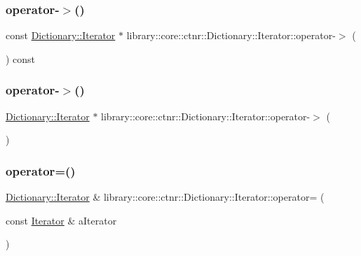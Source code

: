 \subsubsection{\texorpdfstring{operator-\/$>$()}{operator->()}\hspace{0.1cm}{\footnotesize\ttfamily [1/2]}}
{\footnotesize\ttfamily const \mbox{\hyperlink{classlibrary_1_1core_1_1ctnr_1_1_dictionary_1_1_iterator}{Dictionary\+::\+Iterator}} $\ast$ library\+::core\+::ctnr\+::\+Dictionary\+::\+Iterator\+::operator-\/$>$ (\begin{DoxyParamCaption}{ }\end{DoxyParamCaption}) const}

\mbox{\label{classlibrary_1_1core_1_1ctnr_1_1_dictionary_1_1_iterator_a0cb70d2bc0b4cb3e56bb3c951651ee93}} 
\subsubsection{\texorpdfstring{operator-\/$>$()}{operator->()}\hspace{0.1cm}{\footnotesize\ttfamily [2/2]}}
{\footnotesize\ttfamily \mbox{\hyperlink{classlibrary_1_1core_1_1ctnr_1_1_dictionary_1_1_iterator}{Dictionary\+::\+Iterator}} $\ast$ library\+::core\+::ctnr\+::\+Dictionary\+::\+Iterator\+::operator-\/$>$ (\begin{DoxyParamCaption}{ }\end{DoxyParamCaption})}

\mbox{\label{classlibrary_1_1core_1_1ctnr_1_1_dictionary_1_1_iterator_a25b94640a46f6fb83f91d65be0568cd4}} 
\subsubsection{\texorpdfstring{operator=()}{operator=()}}
{\footnotesize\ttfamily \mbox{\hyperlink{classlibrary_1_1core_1_1ctnr_1_1_dictionary_1_1_iterator}{Dictionary\+::\+Iterator}} \& library\+::core\+::ctnr\+::\+Dictionary\+::\+Iterator\+::operator= (\begin{DoxyParamCaption}\item[{const \mbox{\hyperlink{classlibrary_1_1core_1_1ctnr_1_1_dictionary_1_1_iterator}{Iterator}} \&}]{a\+Iterator }\end{DoxyParamCaption})}

